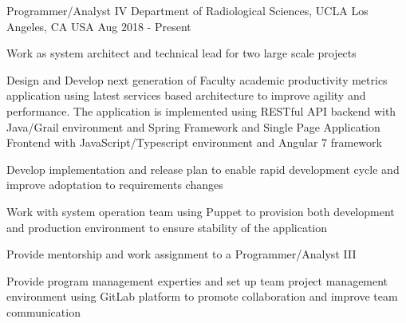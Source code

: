 


\begin{cventries}


  \cventry
    {Programmer/Analyst IV} %
    {Department of Radiological Sciences, UCLA} %
    {Los Angeles, CA USA} %
    {Aug 2018 - Present} %
    {
      \begin{cvitems} %
        \item {Work as system architect and technical lead for two large scale projects}
        \item {Design and Develop next generation of  Faculty academic productivity metrics application using latest services based architecture to improve agility and performance. The application is implemented using RESTful API backend with Java/Grail environment and Spring Framework and Single Page Application Frontend with JavaScript/Typescript environment and Angular 7 framework } 
        \item {Develop implementation and release plan to enable rapid development cycle and improve adoptation to requirements changes}
        \item { Work with system operation team using Puppet to provision both development and production environment to ensure stability of the application}
        \item {Provide mentorship and work assignment to a Programmer/Analyst III }
        \item {Provide program management experties and set up team project management environment using GitLab platform to promote collaboration and improve team communication}
      \end{cvitems}
    }
	


\end{cventries}
